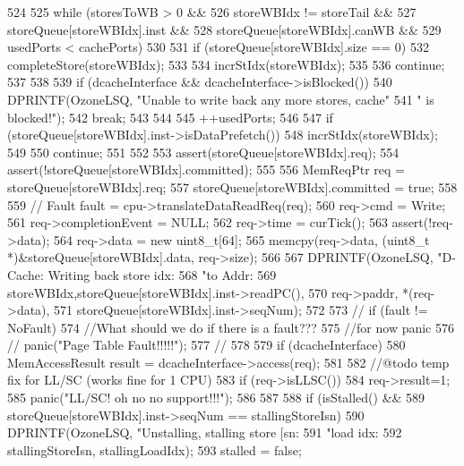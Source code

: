 \begin{DoxyCode}
524 {
525     while (storesToWB > 0 &&
526            storeWBIdx != storeTail &&
527            storeQueue[storeWBIdx].inst &&
528            storeQueue[storeWBIdx].canWB &&
529            usedPorts < cachePorts) {
530 
531         if (storeQueue[storeWBIdx].size == 0) {
532             completeStore(storeWBIdx);
533 
534             incrStIdx(storeWBIdx);
535 
536             continue;
537         }
538 
539         if (dcacheInterface && dcacheInterface->isBlocked()) {
540             DPRINTF(OzoneLSQ, "Unable to write back any more stores, cache"
541                     " is blocked!\n");
542             break;
543         }
544 
545         ++usedPorts;
546 
547         if (storeQueue[storeWBIdx].inst->isDataPrefetch()) {
548             incrStIdx(storeWBIdx);
549 
550             continue;
551         }
552 
553         assert(storeQueue[storeWBIdx].req);
554         assert(!storeQueue[storeWBIdx].committed);
555 
556         MemReqPtr req = storeQueue[storeWBIdx].req;
557         storeQueue[storeWBIdx].committed = true;
558 
559 //      Fault fault = cpu->translateDataReadReq(req);
560         req->cmd = Write;
561         req->completionEvent = NULL;
562         req->time = curTick();
563         assert(!req->data);
564         req->data = new uint8_t[64];
565         memcpy(req->data, (uint8_t *)&storeQueue[storeWBIdx].data, req->size);
566 
567         DPRINTF(OzoneLSQ, "D-Cache: Writing back store idx:%
568                 "to Addr:%
569                 storeWBIdx,storeQueue[storeWBIdx].inst->readPC(),
570                 req->paddr, *(req->data),
571                 storeQueue[storeWBIdx].inst->seqNum);
572 
573 //        if (fault != NoFault) {
574             //What should we do if there is a fault???
575             //for now panic
576 //            panic("Page Table Fault!!!!!\n");
577 //        }
578 
579         if (dcacheInterface) {
580             MemAccessResult result = dcacheInterface->access(req);
581 
582             //@todo temp fix for LL/SC (works fine for 1 CPU)
583             if (req->isLLSC()) {
584                 req->result=1;
585                 panic("LL/SC! oh no no support!!!");
586             }
587 
588             if (isStalled() &&
589                 storeQueue[storeWBIdx].inst->seqNum == stallingStoreIsn) {
590                 DPRINTF(OzoneLSQ, "Unstalling, stalling store [sn:%
591                         "load idx:%
592                         stallingStoreIsn, stallingLoadIdx);
593                 stalled = false;
}}}}
\end{DoxyCode}
